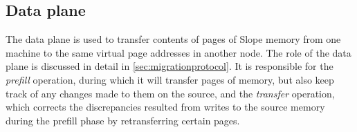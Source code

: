 




\subsection{Data plane}
The data plane is used to transfer contents of pages of Slope
memory from one machine to the same virtual page addresses in another node.
The role of the data plane is discussed in detail in \ref{sec:migrationprotocol}.
It is responsible for the \emph{prefill} operation, during which it will
transfer pages of memory, but also keep track of any changes made to them on
the source, and the \emph{transfer} operation, which corrects the discrepancies
resulted from writes to the source memory during the prefill phase by
retransferring certain pages.

